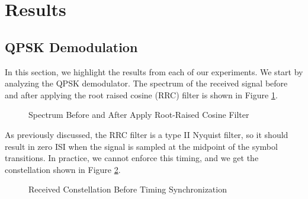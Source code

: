\documentclass[conference,onecolumn]{IEEEtran}
\begin{document}
\section{Results}

\subsection{QPSK Demodulation}

In this section, we highlight the results from each of our experiments. We start by analyzing the QPSK demodulator. The spectrum of the received signal before and after applying the root raised cosine (RRC) filter is shown in Figure \ref{fig::root_raised_cosine_spectrum}.

\begin{figure}[H]
	\centerline{}
	\caption{Spectrum Before and After Apply Root-Raised Cosine Filter}
	\label{fig::root_raised_cosine_spectrum}
\end{figure}

\noindent As previously discussed, the RRC filter is a type II Nyquist filter, so it should result in zero ISI when the signal is sampled at the midpoint of the symbol transitions. In practice, we cannot enforce this timing, and we get the constellation shown in Figure \ref{fig::constellation_no_timing_comp}.

\begin{figure}[H]
	\centerline{}
	\caption{Received Constellation Before Timing Synchronization}
	\label{fig::constellation_no_timing_comp}
\end{figure}
\end{document}
